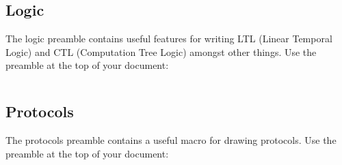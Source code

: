 \subsection{Logic}
The logic preamble contains useful features for writing LTL (Linear Temporal Logic) and CTL (Computation Tree Logic) amongst other things. Use the  preamble at the top of your document:
\begin{lstlisting}[language=MyTex]
 \end{lstlisting}



\subsection{Protocols}
The protocols preamble contains a useful macro for drawing protocols. Use the  preamble at the top of your document:
\begin{lstlisting}[language=MyTex]
 \end{lstlisting}

